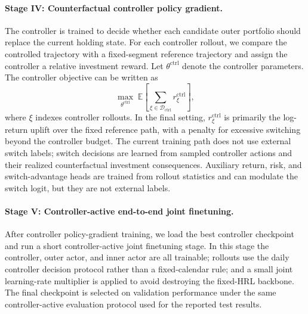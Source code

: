 \documentclass[letterpaper]{article} %
\begin{document}
\paragraph{Stage IV: Counterfactual controller policy gradient.}
The controller is trained to decide whether each candidate outer portfolio should replace the current holding state. For each controller rollout, we compare the controlled trajectory with a fixed-segment reference trajectory and assign the controller a relative investment reward. Let \(\theta^{\mathrm{ctrl}}\) denote the controller parameters. The controller objective can be written as
\[
\max_{\theta^{\mathrm{ctrl}}}
\;
\mathbb{E}\!\left[
\sum_{\xi\in\mathcal{D}_{\mathrm{ctrl}}}
r_{\xi}^{\mathrm{ctrl}}
\right],
\]
where \(\xi\) indexes controller rollouts. In the final setting, \(r_{\xi}^{\mathrm{ctrl}}\) is primarily the log-return uplift over the fixed reference path, with a penalty for excessive switching beyond the controller budget. The current training path does not use external switch labels; switch decisions are learned from sampled controller actions and their realized counterfactual investment consequences. Auxiliary return, risk, and switch-advantage heads are trained from rollout statistics and can modulate the switch logit, but they are not external labels.

\paragraph{Stage V: Controller-active end-to-end joint finetuning.}
After controller policy-gradient training, we load the best controller checkpoint and run a short controller-active joint finetuning stage. In this stage the controller, outer actor, and inner actor are all trainable; rollouts use the daily controller decision protocol rather than a fixed-calendar rule; and a small joint learning-rate multiplier is applied to avoid destroying the fixed-HRL backbone. The final checkpoint is selected on validation performance under the same controller-active evaluation protocol used for the reported test results.
\end{document}
